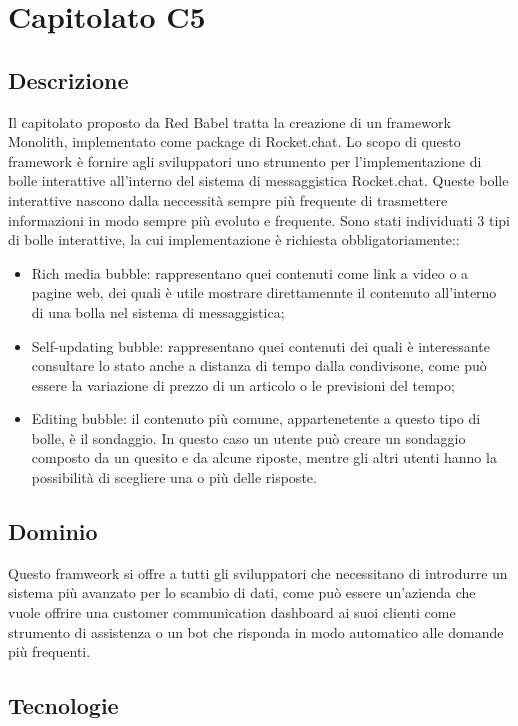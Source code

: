 \newpage
\section{Capitolato C5}

\subsection{Descrizione}

Il capitolato proposto da Red Babel tratta la creazione di un framework
Monolith, implementato come package di Rocket.chat. Lo scopo di questo
framework è fornire agli sviluppatori uno strumento per l'implementazione
di bolle interattive all'interno del sistema di messaggistica Rocket.chat.
Queste bolle interattive nascono dalla neccessità sempre più frequente
di trasmettere informazioni in modo sempre più evoluto e frequente.
Sono stati individuati 3 tipi di bolle interattive, la cui implementazione è richiesta obbligatoriamente:: 
\begin{itemize}
	\item Rich media bubble: rappresentano quei contenuti come link a video
	o a pagine web, dei quali è utile mostrare direttamennte il contenuto
	all'interno di una bolla nel sistema di messaggistica;
	\item Self-updating bubble: rappresentano quei contenuti dei quali è interessante
	consultare lo stato anche a distanza di tempo dalla condivisone, come
	può essere la variazione di prezzo di un articolo o le previsioni
	del tempo;
	\item Editing bubble: il contenuto più comune, appartenetente a questo tipo
	di bolle, è il sondaggio. In questo caso un utente può creare un sondaggio
	composto da un quesito e da alcune riposte, mentre gli altri utenti
	hanno la possibilità di scegliere una o più delle risposte.
\end{itemize}


\subsection{Dominio}

Questo framweork si offre a tutti gli sviluppatori che necessitano
di introdurre un sistema più avanzato per lo scambio di dati, come
può essere un'azienda che vuole offrire una customer communication
dashboard ai suoi clienti come strumento di assistenza o un bot che
risponda in modo automatico alle domande più frequenti. 

\subsection{Tecnologie}

